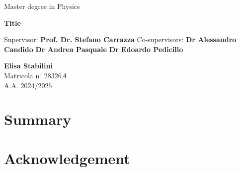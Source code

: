 \documentclass{book}
\theoremstyle{definition}
\begin{document}

\begin{center}
{\Large  Master degree in Physics }
\end{center}


\vskip1.5cm
\begin{center}
{\fontsize{15}{20}\selectfont \textbf{Title\\}}
\end{center}


{\large
\vskip 20mm Supervisor:
\vskip 0.2mm \large  \textbf{Prof. Dr. Stefano Carrazza}
\vskip 5mm
\large Co-supervisors:
\vskip 0.2mm
\large \textbf{Dr Alessandro Candido}
\vskip 0.2mm
\large \textbf{Dr Andrea Pasquale}
\vskip 0.2mm
\large \textbf{Dr Edoardo Pedicillo}
}


\vskip 2cm
\hskip 9cm\parbox[t]{7cm}
{\large 
\textbf{Elisa Stabilini}\\
Matricola n$^\circ$ $28326A$\\
A.A. $2024$/$2025$\\      
}
\clearpage


\clearpage
\tableofcontents
\clearpage

\chapter*{Summary}
%


\chapter*{Acknowledgement}
\end{document}

